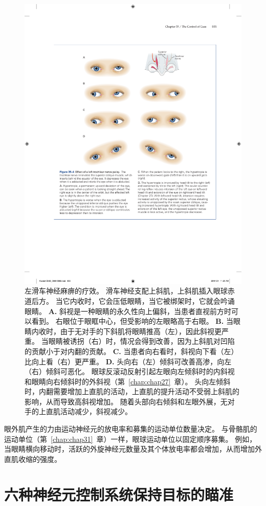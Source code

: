\begin{figure}[htbp]
	\centering
	\includegraphics[width=0.78\linewidth]{chap35/fig_35_4}
	\caption{左滑车神经麻痹的疗效。
		滑车神经支配上斜肌，上斜肌插入眼球赤道后方。
		当它内收时，它会压低眼睛，当它被绑架时，它就会吟诵眼睛。
		\textbf{A.} 斜视是一种眼睛的永久性向上偏斜，当患者直视前方时可以看到。
		右眼位于眼眶中心，但受影响的左眼略高于右眼。
		\textbf{B.} 当眼睛内收时，由于无对手的下斜肌将眼睛推高（左），因此斜视更严重。
		当眼睛被诱拐（右）时，情况会得到改善，因为上斜肌对凹陷的贡献小于对内翻的贡献。
		\textbf{C.} 当患者向右看时，斜视向下看（左）比向上看（右）更严重。
		\textbf{D.} 头向右（左）倾斜可改善高渗，向左（右）倾斜可恶化。
		眼球反滚动反射引起左眼向左倾斜时的内斜视和眼睛向右倾斜时的外斜视（第~\ref{chap:chap27}~章）。
		头向左倾斜时，内翻需要增加上直肌的活动，上直肌的提升活动不受弱上斜肌的影响，从而导致高斜视增加。
		随着头部向右倾斜和左眼外展，无对手的上直肌活动减少，斜视减少。}
	\label{fig:35_4}
\end{figure}


眼外肌产生的力由运动神经元的放电率和募集的运动单位数量决定。
与骨骼肌的运动单位（第~\ref{chap:chap31}~章）一样，眼球运动单位以固定顺序募集。
例如，当眼睛横向移动时，活跃的外旋神经元数量及其个体放电率都会增加，从而增加外直肌收缩的强度。



\section{六种神经元控制系统保持目标的瞄准}

